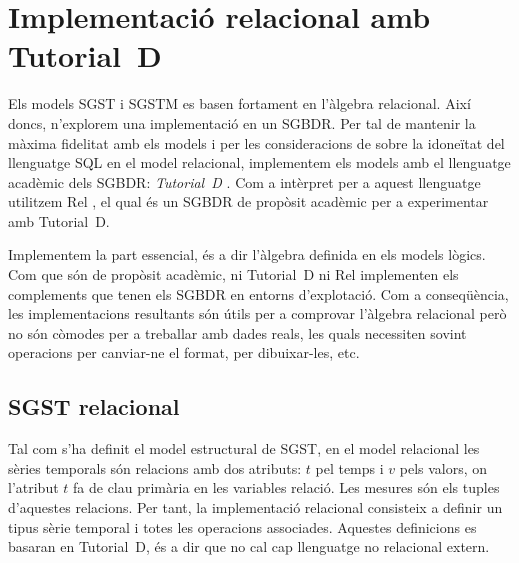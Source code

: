 \chapter{Implementació relacional amb Tutorial~D}

Els models \gls{SGST} i \gls{SGSTM} es basen fortament en l'àlgebra
relacional.  Així doncs, n'explorem una implementació en un
\gls{SGBDR}. Per tal de mantenir la màxima fidelitat amb els models i
per les consideracions de \textcite[cap.~1--4]{date04:introduction8}
sobre la idoneïtat del llenguatge \gls{SQL} en el model relacional,
implementem els models amb el llenguatge acadèmic dels \gls{SGBDR}:
\emph{Tutorial~D} \parencite{date04:introduction8,date:thethirdmanifesto,date:tutoriald}. Com
a intèrpret per a aquest llenguatge utilitzem Rel \parencite{rel}, el
qual és un \gls{SGBDR} de propòsit acadèmic per a experimentar amb
Tutorial~D.





Implementem la part essencial, és a dir l'àlgebra definida en els
models lògics. Com que són de propòsit acadèmic, ni Tutorial~D ni Rel
implementen els complements que tenen els \gls{SGBDR} en entorns
d'explotació. Com a conseqüència, les implementacions resultants són
útils per a comprovar l'àlgebra relacional però no són còmodes per a
treballar amb dades reals, les quals necessiten sovint operacions
per canviar-ne el format, per dibuixar-les, etc.




\section{SGST relacional}


Tal com s'ha definit el model estructural de \gls{SGST}, en el model
relacional les sèries temporals són relacions amb dos atributs: $t$
pel temps i $v$ pels valors, on l'atribut $t$ fa de clau primària en
les variables relació.  Les mesures són els tuples d'aquestes
relacions.  Per tant, la implementació relacional consisteix a definir
un tipus sèrie temporal i totes les operacions associades. Aquestes
definicions es basaran en Tutorial~D, és a dir que no cal cap
llenguatge no relacional extern.

